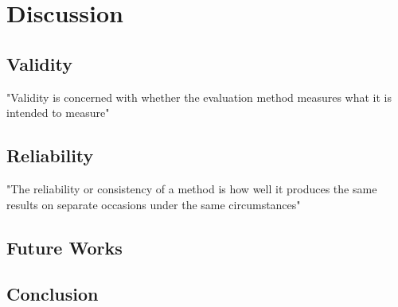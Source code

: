 \chapter{Discussion}
\section{Validity}
	"Validity is concerned with whether the evaluation method measures what it is intended to measure"\cite{interactionDesign}
\section{Reliability}
	"The reliability or consistency of a method is how well it produces the same results on separate occasions under the same circumstances"\cite{interactionDesign}

\section {Future Works}


\section {Conclusion}
